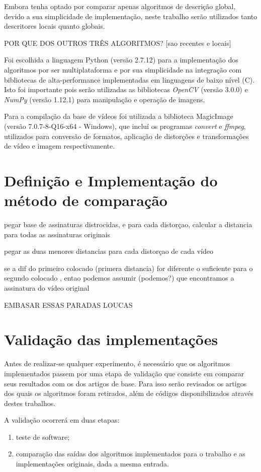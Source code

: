 Embora \citeauthor{sylvio2015} tenha optado por comparar apenas algoritmos de descrição global, devido a sua simplicidade de implementação, neste trabalho serão utilizados tanto descritores locais quanto globais.

POR QUE DOS OUTROS TRÊS ALGORITMOS?
[sao recentes e locais]


Foi escolhida a linguagem Python (versão 2.7.12) para a implementação dos algoritmos por ser multiplataforma e  por sua simplicidade na integração com bibliotecas de alta-performance implementadas em linguagens de baixo nível (C). Isto foi importante pois serão utilizadas as bibliotecas \textit{OpenCV} (versão 3.0.0) e \textit{NumPy} (versão 1.12.1) para manipulação e operação de imagens.

Para a compilação da base de vídeos foi utilizada a biblioteca MagicImage (versão 7.0.7-8-Q16-x64 - Windows), que incluí os programas \textit{convert} e \textit{ffmpeg}, utilizados para conversão de formatos, aplicação de distorções e transformações de vídeo e imagem respectivamente.

\section{Definição e Implementação do método de comparação}




pegar base de assinaturas distrocidas, e para cada distorçao, calcular a distancia para todas as assinaturas originais

pegar as duas menores distancias para cada distorçao de cada vídeo

se a dif do primeiro colocado (primera distancia) for diferente o suficiente para o segundo colocado , entao podemos assumir (podemos?) que encontramos a assinatura do vídeo original

EMBASAR ESSAS PARADAS LOUCAS

\section{Validação das implementações}

Antes de realizar-se qualquer experimento, é necessário que os algoritmos implementados passem por uma etapa de validação que consiste em comparar seus resultados com os dos artigos de base. Para isso serão revisados os artigos dos quais os algoritmos foram retirados, além de códigos disponibilizados através destes trabalhos.

A validação ocorrerá em duas etapas:

\begin{enumerate}
\item teste de software;
\item comparação das saídas dos algoritmos implementados para o trabalho e as implementações originais, dada a mesma entrada.
\end{enumerate}

